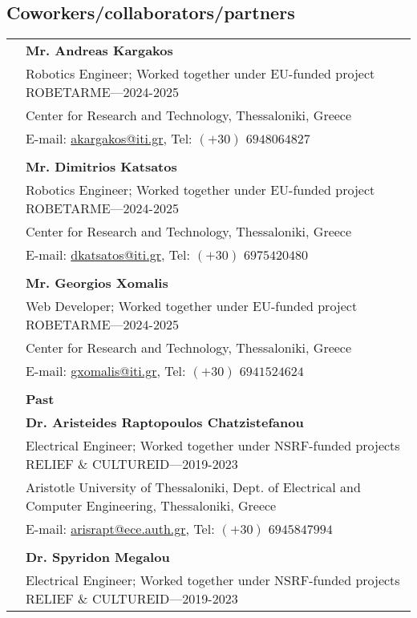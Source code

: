 \documentclass[a4paper,10pt,twoside]{article}
\begin{document}
\subsection*{Coworkers/collaborators/partners}
\vspace{0.5cm}
\begin{tabular}{rp{14cm}}
& \textbf{Mr. Andreas Kargakos} \\
& {Robotics Engineer; Worked together under EU-funded project ROBETARME}---2024-2025\\
& Center for Research and Technology, Thessaloniki, Greece \\
& E-mail: \href{mailto: akargakos@iti.gr}{akargakos@iti.gr}, Tel: $(+30)$ $694 806 4827$  \\
&\\
& \textbf{Mr. Dimitrios Katsatos} \\
& {Robotics Engineer; Worked together under EU-funded project ROBETARME}---2024-2025\\
&Center for Research and Technology, Thessaloniki, Greece \\
& E-mail: \href{mailto: dkatsatos@iti.gr}{dkatsatos@iti.gr}, Tel: $(+30)$ $697 542 0480$ \\
&\\
& \textbf{Mr. Georgios Xomalis} \\
& {Web Developer; Worked together under EU-funded project ROBETARME}---2024-2025\\
&Center for Research and Technology, Thessaloniki, Greece \\
& E-mail: \href{mailto: gxomalis@iti.gr}{gxomalis@iti.gr}, Tel: $(+30)$ $694 152 4624$ \\
&\\
& \textbf{Past}  \vspace{0.15cm} \\
& \textbf{Dr. Aristeides Raptopoulos Chatzistefanou} \\
& {Electrical Engineer; Worked together under NSRF-funded projects RELIEF \& CULTUREID}---2019-2023\\
&Aristotle University of Thessaloniki, Dept. of Electrical and Computer Engineering, Thessaloniki, Greece \\
& E-mail: \href{mailto: arisrapt@ece.auth.gr}{arisrapt@ece.auth.gr}, Tel: $(+30)$ $694 584 7994$ \\
&\\
& \textbf{Dr. Spyridon Megalou} \\
& {Electrical Engineer; Worked together under NSRF-funded projects RELIEF \& CULTUREID}---2019-2023\\

\end{tabular}
\end{document}
